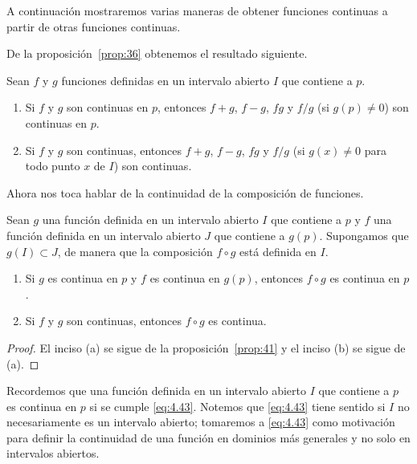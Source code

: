 \documentclass[12pt,a4paper]{book}
\begin{document}
    A continuación mostraremos varias maneras de obtener funciones continuas
    a partir de otras funciones continuas.

    De la proposición~\ref{prop:36} obtenemos el resultado siguiente.

    \begin{proposicion}\label{prop:56}
        Sean $f$ y $g$ funciones
        definidas en un intervalo abierto $I$ que contiene a $p$.
        \begin{enumerate}[nosep]
            \item Si $f$ y $g$ son continuas en $p$, entonces $f+g$, $f-g$, $fg$ y $f/g$ (si $g(p)\neq 0$)
            son continuas en $p$.
            \item Si $f$ y $g$ son continuas, entonces $f+g$, $f-g$, $fg$ y $f/g$ (si $g(x)\neq 0$ para
            todo punto $x$ de $I$) son continuas.
        \end{enumerate}
    \end{proposicion}

    Ahora nos toca hablar de la continuidad de la composición de funciones.

    \begin{proposicion}\label{prop:57}
        Sean
        $g$ una función definida en un intervalo abierto $I$ que contiene a $p$ y $f$ una
        función definida en un intervalo abierto $J$ que contiene a $g(p)$. Supongamos
        que $g(I)\subset J$, de manera que la composición $f\circ g$ está definida en $I$.
        \begin{enumerate}[nosep]
            \item Si $g$ es continua en $p$ y $f$ es continua en $g(p)$, entonces $f\circ g$ es continua
            en $p$.
            \item Si $f$ y $g$ son continuas, entonces $f\circ g$ es continua.
        \end{enumerate}
    \end{proposicion}

    \begin{proof}
        El inciso (a) se sigue de la proposición~\ref{prop:41} y el inciso (b) se
        sigue de (a).
    \end{proof}

    Recordemos que una función definida en un intervalo abierto $I$ que contiene
    a $p$ es continua en $p$ si se cumple \eqref{eq:4.43}. Notemos que \eqref{eq:4.43} tiene sentido
    si $I$ no necesariamente es un intervalo abierto; tomaremos a \eqref{eq:4.43} como
    motivación para definir la continuidad de una función en dominios más generales
    y no solo en intervalos abiertos.
\end{document}
